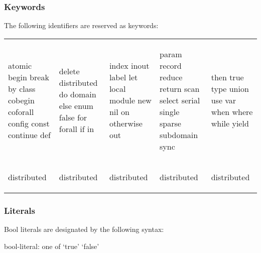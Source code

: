 \subsubsection{Keywords}
\label{Keywords}

The following identifiers are reserved as keywords:

\begin{tabular}{lllll}
\begin{chapel}
atomic
begin
break
by
class
cobegin
coforall
config
const
continue
def
\end{chapel} & \begin{chapel}
delete
distributed
do
domain
else
enum
false
for
forall
if
in
\end{chapel} & \begin{chapel}
index
inout
label
let
local
module
new
nil
on
otherwise
out
\end{chapel} & \begin{chapel}
param
record      
reduce      
return      
scan        
select
serial      
single      
sparse
subdomain
sync        
\end{chapel} & \begin{chapel}
then        
true
type        
union       
use         
var
when        
where       
while       
yield
$$
\end{chapel} \\
\begin{invisible}
distributed
\end{invisible} & \begin{invisible}
distributed
\end{invisible} & \begin{invisible}
distributed
\end{invisible} & \begin{invisible}
distributed
\end{invisible} & \begin{invisible}
distributed
\end{invisible}
\end{tabular}

\subsubsection{Literals}
\label{Literals}
\label{Primitive_Type_Literals}

Bool literals are designated by the following syntax:
\begin{syntax}
bool-literal: one of
  `true' `false'
\end{syntax}

